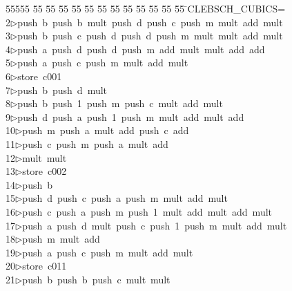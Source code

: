 %
%
\begin{tabbing}
55555 \= 55 \= 55 \= 55 \= 55 \= 55 \= 55 \= 55 \= 55 \= 55 \= 55 \= 55 \= 55 \= \>CLEBSCH\_CUBICS=\\[0pt]
2\>$\triangleright$\>push\ b\ push\ b\ mult\ push\ d\ push\ c\ push\ m\ mult\ add\ mult\ \\[0pt]
3\>$\triangleright$\>push\ b\ push\ c\ push\ d\ push\ d\ push\ m\ mult\ mult\ add\ mult\ \\[0pt]
4\>$\triangleright$\>push\ a\ push\ d\ push\ d\ push\ m\ add\ mult\ mult\ add\ add\ \\[0pt]
5\>$\triangleright$\>push\ a\ push\ c\ push\ m\ mult\ add\ mult\ \\[0pt]
6\>$\triangleright$\>store\ c001\ \\[0pt]
7\>$\triangleright$\>push\ b\ push\ d\ mult\ \\[0pt]
8\>$\triangleright$\>push\ b\ push\ 1\ push\ m\ push\ c\ mult\ add\ mult\ \\[0pt]
9\>$\triangleright$\>push\ d\ push\ a\ push\ 1\ push\ m\ mult\ add\ mult\ add\ \\[0pt]
10\>$\triangleright$\>push\ m\ push\ a\ mult\ add\ push\ c\ add\ \\[0pt]
11\>$\triangleright$\>push\ c\ push\ m\ push\ a\ mult\ add\ \\[0pt]
12\>$\triangleright$\>mult\ mult\ \\[0pt]
13\>$\triangleright$\>store\ c002\ \\[0pt]
14\>$\triangleright$\>push\ b\ \\[0pt]
15\>$\triangleright$\>push\ d\ push\ c\ push\ a\ push\ m\ mult\ add\ mult\ \\[0pt]
16\>$\triangleright$\>push\ c\ push\ a\ push\ m\ push\ 1\ mult\ add\ mult\ add\ mult\ \\[0pt]
17\>$\triangleright$\>push\ a\ push\ d\ mult\ push\ c\ push\ 1\ push\ m\ mult\ add\ mult\ \\[0pt]
18\>$\triangleright$\>push\ m\ mult\ add\ \\[0pt]
19\>$\triangleright$\>push\ a\ push\ c\ push\ m\ mult\ add\ mult\ \\[0pt]
20\>$\triangleright$\>store\ c011\ \\[0pt]
21\>$\triangleright$\>push\ b\ push\ b\ push\ c\ mult\ mult\ \\[0pt]

\end{tabbing}
